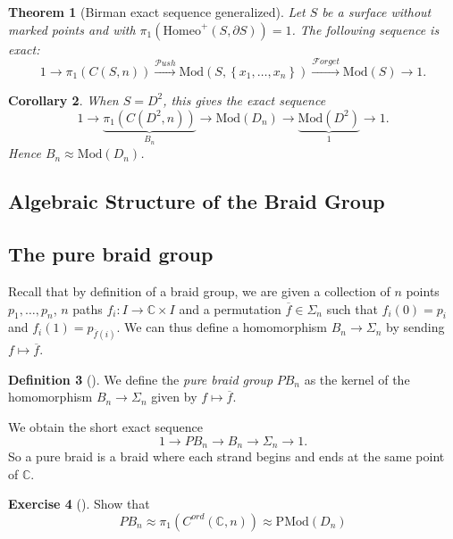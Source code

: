 \documentclass[reqno]{amsart}
\newtheorem{theorem}{Theorem}[section]
\newtheorem{corollary}[theorem]{Corollary}
\theoremstyle{definition}
\newtheorem{definition}[theorem]{Definition}
\newtheorem{exercise}[theorem]{Exercise}
\theoremstyle{remark}
\newcommand{\Mod}{{\mathrm{Mod}}}
\newcommand{\PMod}{{\mathrm{PMod}}}
\newcommand{\Homeo}{{\mathrm{Homeo}}}
\newcommand{\Push}{{\mathcal{P}}ush}
\newcommand{\Forget}{{\mathcal{F}}orget}
\begin{document}
 \begin{theorem}[Birman exact sequence generalized]
     Let $S$ be a surface without marked points
     and with $\pi_1 \left( \Homeo^{+} \left( 
     S, \partial S\right)  \right) = 1$. The following
     sequence is exact:
     \[
     1 \to \pi_1 \left( C \left( S,n \right)  \right) 
     \stackrel{\Push}{\to } \Mod \left( S,
     \left\{ x_1, \ldots, x_n \right\} \right) 
     \stackrel{\Forget}{\to } \Mod (S) \to 1.
     \] 
 \end{theorem}


 \begin{corollary}
     When $S = D^2$, this gives the exact sequence
     \[
         1 \to
         \underbrace{\pi_1 \left( C \left( D^2,n \right)\right)}_{B_n}
     \to \Mod \left( D_n \right) \to 
     \underbrace{\Mod \left( D^2 \right)}_{1} \to 1.
     \] 
     Hence $B_n \approx \Mod \left( D_n \right) $.
 \end{corollary}

 \subsection{Algebraic Structure of the Braid Group}

 \newpage

 \subsection{The pure braid group}

 Recall that by definition of a braid group, we
 are given a collection of $n$ points
 $p_1, \ldots, p_n$, $n$ paths
 $f_i \colon I \to \mathbb{C} \times I$ and
 a permutation $\overline{f} \in \Sigma_n$ such that
 $f_i(0) = p_i$
 and $f_i(1) = p_{\overline{f}(i)}$.
 We can thus define a homomorphism
 $B_n \to \Sigma_n$ by sending
 $f \mapsto \overline{f}$.
 \begin{definition}[]
     We define the \textit{pure braid group} $PB_n$ as
     the kernel of the homomorphism
     $B_n \to \Sigma_n$ given by $f \mapsto \overline{f}$.
 \end{definition}
 We obtain the short exact sequence
 \[
 1 \to PB_n \to B_n \to \Sigma_n \to 1.
 \] 
 So a pure braid is a braid where each strand begins
 and ends at the same point of $\mathbb{C}$.

 \begin{exercise}[]
     Show that
     \[
     PB_n \approx \pi_1 \left( C^{ord } 
     \left( \mathbb{C},n \right) \right) \approx
     \PMod (D_n)
     \] 
 \end{exercise}
\end{document}
